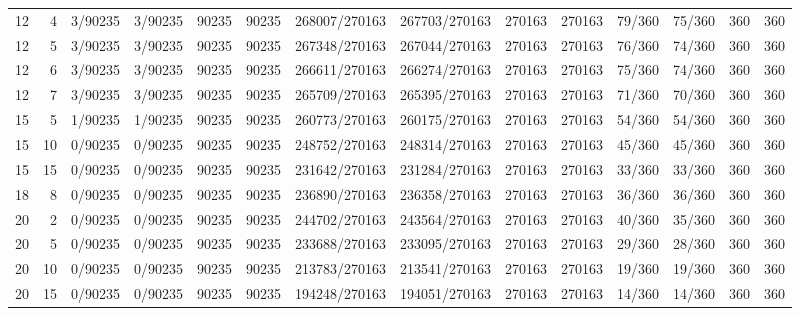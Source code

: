 \begin{tabular}{rrllrrllrrllrr}
12 &  4 &         3/90235 &    3/90235 &          90235 &      90235 & 268007/270163 & 267703/270163 &         270163 &     270163 &      79/360 &     75/360 &        360 &        360 \\
12 &  5 &         3/90235 &    3/90235 &          90235 &      90235 & 267348/270163 & 267044/270163 &         270163 &     270163 &      76/360 &     74/360 &        360 &        360 \\
12 &  6 &         3/90235 &    3/90235 &          90235 &      90235 & 266611/270163 & 266274/270163 &         270163 &     270163 &      75/360 &     74/360 &        360 &        360 \\
12 &  7 &         3/90235 &    3/90235 &          90235 &      90235 & 265709/270163 & 265395/270163 &         270163 &     270163 &      71/360 &     70/360 &        360 &        360 \\
15 &  5 &         1/90235 &    1/90235 &          90235 &      90235 & 260773/270163 & 260175/270163 &         270163 &     270163 &      54/360 &     54/360 &        360 &        360 \\
15 & 10 &         0/90235 &    0/90235 &          90235 &      90235 & 248752/270163 & 248314/270163 &         270163 &     270163 &      45/360 &     45/360 &        360 &        360 \\
15 & 15 &         0/90235 &    0/90235 &          90235 &      90235 & 231642/270163 & 231284/270163 &         270163 &     270163 &      33/360 &     33/360 &        360 &        360 \\
18 &  8 &         0/90235 &    0/90235 &          90235 &      90235 & 236890/270163 & 236358/270163 &         270163 &     270163 &      36/360 &     36/360 &        360 &        360 \\
20 &  2 &         0/90235 &    0/90235 &          90235 &      90235 & 244702/270163 & 243564/270163 &         270163 &     270163 &      40/360 &     35/360 &        360 &        360 \\
20 &  5 &         0/90235 &    0/90235 &          90235 &      90235 & 233688/270163 & 233095/270163 &         270163 &     270163 &      29/360 &     28/360 &        360 &        360 \\
20 & 10 &         0/90235 &    0/90235 &          90235 &      90235 & 213783/270163 & 213541/270163 &         270163 &     270163 &      19/360 &     19/360 &        360 &        360 \\
20 & 15 &         0/90235 &    0/90235 &          90235 &      90235 & 194248/270163 & 194051/270163 &         270163 &     270163 &      14/360 &     14/360 &        360 &        360 \\

\end{tabular}

